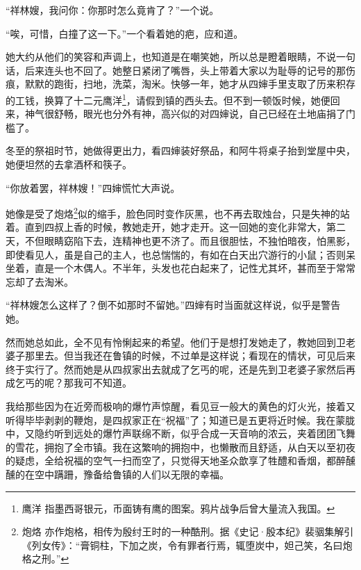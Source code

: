 \par “祥林嫂，我问你：你那时怎么竟肯了？”一个说。
\par “唉，可惜，白撞了这一下。”一个看着她的疤，应和道。
\par 她大约从他们的笑容和声调上，也知道是在嘲笑她，所以总是瞪着眼睛，不说一句话，后来连头也不回了。她整日紧闭了嘴唇，头上带着大家以为耻辱的记号的那伤痕，默默的跑街，扫地，洗菜，淘米。快够一年，她才从四婶手里支取了历来积存的工钱，换算了十二元鹰洋\footnote{鹰洋 指墨西哥银元，币面铸有鹰的图案。鸦片战争后曾大量流入我国。}，请假到镇的西头去。但不到一顿饭时候，她便回来，神气很舒畅，眼光也分外有神，高兴似的对四婶说，自己已经在土地庙捐了门槛了。
\par 冬至的祭祖时节，她做得更出力，看四婶装好祭品，和阿牛将桌子抬到堂屋中央，她便坦然的去拿酒杯和筷子。
\par “你放着罢，祥林嫂！”四婶慌忙大声说。
\par 她像是受了炮烙\footnote{炮烙 亦作炮格，相传为殷纣王时的一种酷刑。据《史记·殷本纪》裴骃集解引《列女传》：“膏铜柱，下加之炭，令有罪者行焉，辄堕炭中，妲己笑，名曰炮格之刑。”}似的缩手，脸色同时变作灰黑，也不再去取烛台，只是失神的站着。直到四叔上香的时候，教她走开，她才走开。这一回她的变化非常大，第二天，不但眼睛窈陷下去，连精神也更不济了。而且很胆怯，不独怕暗夜，怕黑影，即使看见人，虽是自己的主人，也总惴惴的，有如在白天出穴游行的小鼠；否则呆坐着，直是一个木偶人。不半年，头发也花白起来了，记性尤其坏，甚而至于常常忘却了去淘米。
\par “祥林嫂怎么这样了？倒不如那时不留她。”四婶有时当面就这样说，似乎是警告她。
\par 然而她总如此，全不见有怜悧起来的希望。他们于是想打发她走了，教她回到卫老婆子那里去。但当我还在鲁镇的时候，不过单是这样说；看现在的情状，可见后来终于实行了。然而她是从四叔家出去就成了乞丐的呢，还是先到卫老婆子家然后再成乞丐的呢？那我可不知道。
\par 我给那些因为在近旁而极响的爆竹声惊醒，看见豆一般大的黄色的灯火光，接着又听得毕毕剥剥的鞭炮，是四叔家正在“祝福”了；知道已是五更将近时候。我在蒙胧中，又隐约听到远处的爆竹声联绵不断，似乎合成一天音响的浓云，夹着团团飞舞的雪花，拥抱了全市镇。我在这繁响的拥抱中，也懒散而且舒适，从白天以至初夜的疑虑，全给祝福的空气一扫而空了，只觉得天地圣众歆享了牲醴和香烟，都醉醺醺的在空中蹒跚，豫备给鲁镇的人们以无限的幸福。
\par {}






